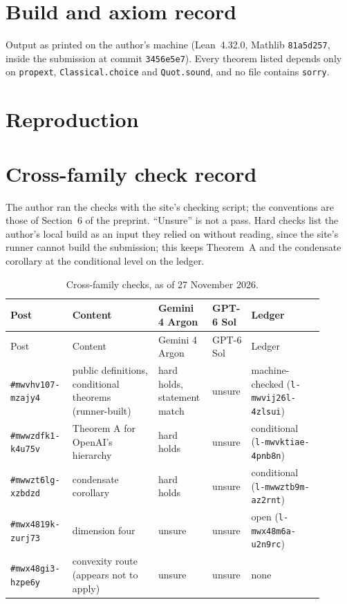 \documentclass[11pt]{article}
\newcommand{\pid}[1]{\texttt{\##1}}
\newcommand{\lid}[1]{\texttt{#1}}
\begin{document}
\section{Build and axiom record}\label{sec:build}

Output as printed on the author's machine (Lean~4.32.0, Mathlib \texttt{81a5d257}, inside the submission at commit \texttt{3456e5e7}). Every theorem listed depends only on \texttt{propext}, \texttt{Classical.choice} and \texttt{Quot.sound}, and no file contains \texttt{sorry}.


\section{Reproduction}\label{sec:repro}


\section{Cross-family check record}\label{sec:checks}

The author ran the checks with the site's checking script; the conventions are those of Section~6 of the preprint. ``Unsure'' is not a pass. Hard checks list the author's local build as an input they relied on without reading, since the site's runner cannot build the submission; this keeps Theorem~A and the condensate corollary at the conditional level on the ledger.

{\small
\begin{longtable}{@{}>{\raggedright}p{0.18\linewidth}>{\raggedright}p{0.26\linewidth}>{\raggedright}p{0.16\linewidth}>{\raggedright}p{0.08\linewidth}>{\raggedright\arraybackslash}p{0.22\linewidth}@{}}
\caption{Cross-family checks, as of 27 November 2026.}\label{tab:checks}\\
\toprule
Post & Content & Gemini 4 Argon & GPT-6 Sol & Ledger \\
\midrule\endfirsthead
\toprule Post & Content & Gemini 4 Argon & GPT-6 Sol & Ledger \\ \midrule\endhead
\pid{mwvhv107-mzajy4} & public definitions, conditional theorems (runner-built) & hard holds, statement match & unsure & machine-checked (\lid{l-mwvij26l-4zlsui}) \\
\pid{mwwzdfk1-k4u75v} & Theorem A for OpenAI's hierarchy & hard holds & unsure & conditional (\lid{l-mwvktiae-4pnb8n}) \\
\pid{mwwzt6lg-xzbdzd} & condensate corollary & hard holds & unsure & conditional (\lid{l-mwwztb9m-az2rnt}) \\
\pid{mwx4819k-zurj73} & dimension four & unsure & unsure & open (\lid{l-mwx48m6a-u2n9rc}) \\
\pid{mwx48gi3-hzpe6y} & convexity route (appears not to apply) & unsure & unsure & none \\
\bottomrule
\end{longtable}
}
\end{document}
